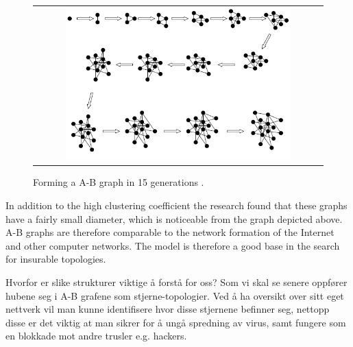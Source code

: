 \begin{figure}
\centering
\begin{tabular}{@{}c@{}}
\includegraphics[width=0.8\textwidth]{../Figures/ABgraphcreation.png}
\end{tabular}
\caption{\label{fig:ABgraphcreation} Forming a A-B graph in 15 generations \cite{audestad}.}
\end{figure}

In addition to the high clustering coefficient the research found that these graphs have a fairly small diameter, which is noticeable from the graph depicted above. A-B graphs are therefore comparable to the network formation of the Internet and other computer networks. The model is therefore a good base in the search for insurable topologies. 


Hvorfor er slike strukturer viktige å forstå for oss? 
Som vi skal se senere oppfører hubene seg i A-B grafene som stjerne-topologier. 
Ved å ha oversikt over sitt eget nettverk vil man kunne identifisere hvor disse stjernene befinner seg, nettopp disse er det viktig at man sikrer for å ungå spredning av virus, samt fungere som en blokkade mot andre trusler e.g. hackers. 







